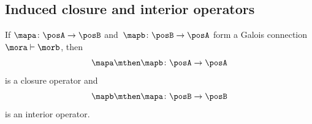 \subsection{Induced closure and interior operators}

\begin{lemma}\label{lem:closure-interior-operators-from-Galois-connection}
    If $\mapa \colon \posA \to \posB$ and~$\mapb \colon \posB \to \posA$ form a Galois connection $\mora \vdash \morb$, then
    \begin{equation}\label{eq:closure-from-Galois}
        \mapa \mthen \mapb \colon \posA \to \posA
    \end{equation}
    is a closure operator and
    \begin{equation}\label{eq:interior-from-Galois}
        \mapb \mthen \mapa \colon \posB \to \posB
    \end{equation}
    is an interior operator.
\end{lemma}

